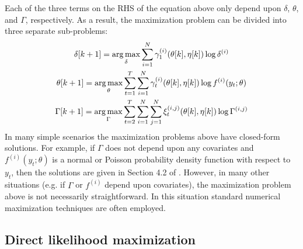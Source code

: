 Each of the three terms on the RHS of the equation above only depend upon $\delta$, $\theta$, and $\Gamma$, respectively. As a result, the maximization problem can be divided into three separate sub-problems:
%
\begin{gather}
    \delta[k+1] = \operatorname*{arg\,max}_{\delta} \sum_{i=1}^N \gamma^{(i)}_1(\theta[k],\eta[k]) \log \delta^{(i)} \label{eqn:EM_update_delta} \\
    \theta[k+1] = \operatorname*{arg\,max}_{\theta} \sum_{t = 1}^T \sum_{i=1}^N \gamma^{(i)}_t(\theta[k],\eta[k]) \log f^{(i)}(y_t;\theta) \label{eqn:EM_update_theta} \\
    \Gamma[k+1] = \operatorname*{arg\,max}_{\Gamma} \sum_{t=2}^{T} \sum_{i=1}^N \sum_{j=1}^N \xi_t^{(i,j)}(\theta[k],\eta[k]) \log \Gamma^{(i,j)} \label{eqn:EM_update_Gamma}
\end{gather}
%
In many simple scenarios the maximization problems above have closed-form solutions. For example, if $\Gamma$ does not depend upon any covariates and $f^{(i)}(y_t;\theta)$ is a normal or Poisson probability density function with respect to $y_t$, then the solutions are given in Section 4.2 of \citet{Zucchini:2016}. However, in many other situations (e.g. if $\Gamma$ or $f^{(i)}$ depend upon covariates), the maximization problem above is not necessarily straightforward. In this situation standard numerical maximization techniques are often employed.

\subsection{Direct likelihood maximization}

